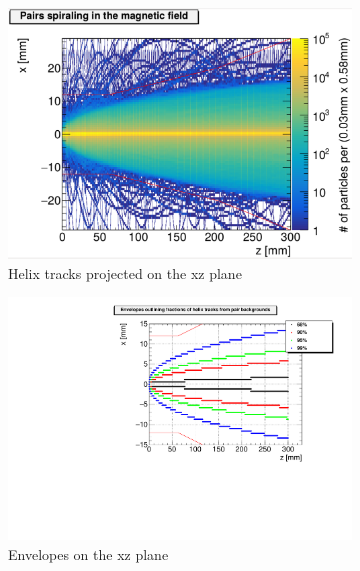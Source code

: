 \begin{figure}
    \centering
    \begin{subfigure}[b]{0.49\textwidth}
    \centering
        \includegraphics[height=0.26\textheight]{figures/Helix_tracks_xz_1bunch_lowres.pdf}
        \caption{Helix tracks projected on the xz plane}
	\label{fig:helix_xz}
    \end{subfigure}
    \begin{subfigure}[b]{0.49\textwidth}
    \centering
        \includegraphics[height=0.26\textheight]{figures/HelixEnvelopes_xz.pdf}
        \caption{Envelopes on the xz plane}
        \label{fig:envelopes_xz}
    \end{subfigure}\\
    \begin{subfigure}[b]{0.49\textwidth}

\end{subfigure}
\end{figure}
